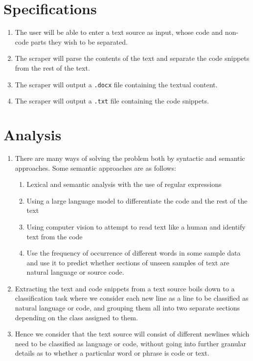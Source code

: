\documentclass[12pt]{scrreprt}
\newcommand{\ttt}[1]{\texttt{#1}}
\begin{document}
\section{Specifications}

\begin{enumerate}
    \item The user will be able to enter a text source as input, whose code and non-code parts they wish to be separated.
    \item The scraper will parse the contents of the text and separate the code snippets from the rest of the text.
    \item The scraper will output a \texttt{.docx} file containing the textual content.
    \item The scraper will output a \ttt{.txt} file containing the code snippets.  
\end{enumerate}



\section{Analysis}

\begin{enumerate}
    \item There are many ways of solving the problem both by syntactic and semantic approaches. Some semantic approaches are as follows:
        \begin{enumerate}
            \item Lexical and semantic analysis with the use of regular expressions
            \item Using a large language model to differentiate the code and the rest of the text 
            \item Using computer vision to attempt to read text like a human and identify text from the code
            \item Use the frequency of occurrence of different words in some sample data and use it to predict whether sections of unseen samples of text are natural language or source code. 
        \end{enumerate}
    \item Extracting the text and code snippets from a text source boils down to a classification task where we consider each new line as a line to be classified as natural language or code, and grouping them all into two separate sections depending on the class assigned to them.
    \item Hence we consider that the text source will consist of different newlines which need to be classified as language or code, without going into further granular details as to whether a particular word or phrase is code or text.
    

\end{enumerate}
\end{document}
